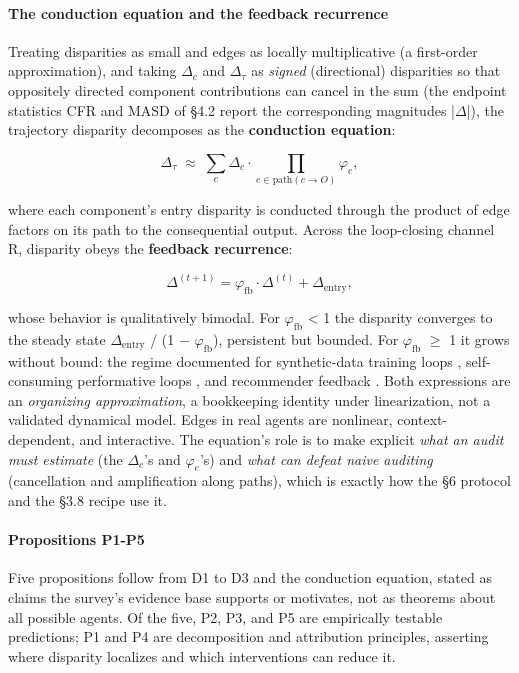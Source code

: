 \documentclass[acmsmall,nonacm]{acmart}
\begin{document}
\paragraph{The conduction equation and the feedback recurrence}

Treating disparities as small and edges as locally multiplicative (a first-order approximation), and taking $\Delta_c$ and $\Delta_\tau$ as \emph{signed} (directional) disparities so that oppositely directed component contributions can cancel in the sum (the endpoint statistics CFR and MASD of \S{}4.2 report the corresponding magnitudes |$\Delta$|), the trajectory disparity decomposes as the \textbf{conduction equation}:

\[ \Delta_\tau \;\approx\; \sum_c \Delta_c \cdot \!\!\prod_{e \in \mathrm{path}(c \rightarrow O)}\!\! \varphi_e, \]

where each component's entry disparity is conducted through the product of edge factors on its path to the consequential output. Across the loop-closing channel R, disparity obeys the \textbf{feedback recurrence}:

\[ \Delta^{(t+1)} = \varphi_{\mathrm{fb}} \cdot \Delta^{(t)} + \Delta_{\mathrm{entry}}, \]

whose behavior is qualitatively bimodal. For $\varphi_{\mathrm{fb}}$ < 1 the disparity converges to the steady state $\Delta_{\mathrm{entry}}$ / (1 $-$ $\varphi_{\mathrm{fb}}$), persistent but bounded. For $\varphi_{\mathrm{fb}}$ $\geq$ 1 it grows without bound: the regime documented for synthetic-data training loops \cite{wyllie2024fairness}, self-consuming performative loops \cite{wang2026observations}, and recommender feedback \cite{mansoury2020feedback}. Both expressions are an \emph{organizing approximation}, a bookkeeping identity under linearization, not a validated dynamical model. Edges in real agents are nonlinear, context-dependent, and interactive. The equation's role is to make explicit \emph{what an audit must estimate} (the $\Delta_c$'s and $\varphi_e$'s) and \emph{what can defeat naive auditing} (cancellation and amplification along paths), which is exactly how the \S{}6 protocol and the \S{}3.8 recipe use it.

\paragraph{Propositions P1-P5}

Five propositions follow from D1 to D3 and the conduction equation, stated as claims the survey's evidence base supports or motivates, not as theorems about all possible agents. Of the five, P2, P3, and P5 are empirically testable predictions; P1 and P4 are decomposition and attribution principles, asserting where disparity localizes and which interventions can reduce it.
\end{document}
